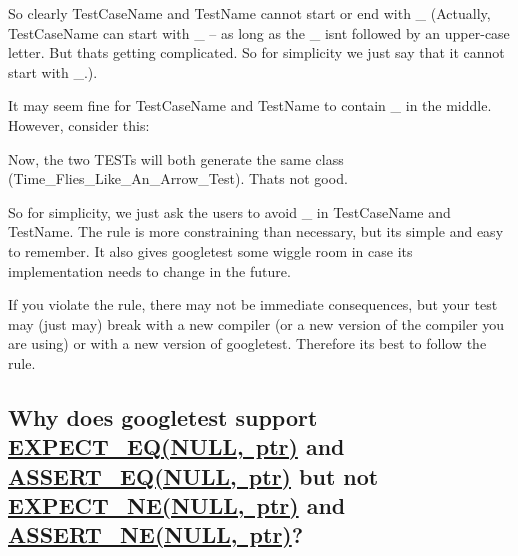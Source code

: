So clearly {\ttfamily Test\+Case\+Name} and {\ttfamily Test\+Name} cannot start or end with {\ttfamily \+\_\+} (Actually, {\ttfamily Test\+Case\+Name} can start with {\ttfamily \+\_\+} -- as long as the {\ttfamily \+\_\+} isn\textquotesingle{}t followed by an upper-\/case letter. But that\textquotesingle{}s getting complicated. So for simplicity we just say that it cannot start with {\ttfamily \+\_\+}.).

It may seem fine for {\ttfamily Test\+Case\+Name} and {\ttfamily Test\+Name} to contain {\ttfamily \+\_\+} in the middle. However, consider this\+:


\begin{DoxyCode}{0}
\end{DoxyCode}


Now, the two {\ttfamily T\+E\+ST}s will both generate the same class ({\ttfamily Time\+\_\+\+Flies\+\_\+\+Like\+\_\+\+An\+\_\+\+Arrow\+\_\+\+Test}). That\textquotesingle{}s not good.

So for simplicity, we just ask the users to avoid {\ttfamily \+\_\+} in {\ttfamily Test\+Case\+Name} and {\ttfamily Test\+Name}. The rule is more constraining than necessary, but it\textquotesingle{}s simple and easy to remember. It also gives googletest some wiggle room in case its implementation needs to change in the future.

If you violate the rule, there may not be immediate consequences, but your test may (just may) break with a new compiler (or a new version of the compiler you are using) or with a new version of googletest. Therefore it\textquotesingle{}s best to follow the rule.

\subsection*{Why does googletest support {\ttfamily \mbox{\hyperlink{_obj__test_2lib_2googletest-release-1_88_81_2googletest_2include_2gtest_2gtest_8h_a4159019abda84f5366acdb7604ff220a}{E\+X\+P\+E\+C\+T\+\_\+\+E\+Q(\+N\+U\+L\+L, ptr)}}} and {\ttfamily \mbox{\hyperlink{_obj__test_2lib_2googletest-release-1_88_81_2googletest_2include_2gtest_2gtest_8h_a1a6db8b1338ee7040329322b77779086}{A\+S\+S\+E\+R\+T\+\_\+\+E\+Q(\+N\+U\+L\+L, ptr)}}} but not {\ttfamily \mbox{\hyperlink{_obj__test_2lib_2googletest-release-1_88_81_2googletest_2include_2gtest_2gtest_8h_a6ae7443947f25abc58bfcfcfc56b0d75}{E\+X\+P\+E\+C\+T\+\_\+\+N\+E(\+N\+U\+L\+L, ptr)}}} and {\ttfamily \mbox{\hyperlink{_obj__test_2lib_2googletest-release-1_88_81_2googletest_2include_2gtest_2gtest_8h_aa866c8dece57912e6f51495ed3e8d8d5}{A\+S\+S\+E\+R\+T\+\_\+\+N\+E(\+N\+U\+L\+L, ptr)}}}?}

